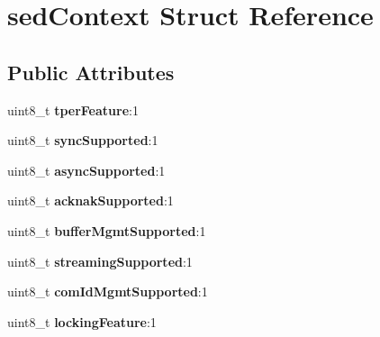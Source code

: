 \hypertarget{structsedContext}{}\section{sed\+Context Struct Reference}
\label{structsedContext}
\subsection*{Public Attributes}
\begin{DoxyCompactItemize}
\item 
\hypertarget{structsedContext_a61b26a703c8644656c659209c41af8ef}{}uint8\+\_\+t {\bfseries tper\+Feature}\+:1\label{structsedContext_a61b26a703c8644656c659209c41af8ef}

\item 
\hypertarget{structsedContext_aca5ece3d17d3036b8eac39f3b74863ba}{}uint8\+\_\+t {\bfseries sync\+Supported}\+:1\label{structsedContext_aca5ece3d17d3036b8eac39f3b74863ba}

\item 
\hypertarget{structsedContext_a5ebedb21ebad3a956ec98db8b57cd6a3}{}uint8\+\_\+t {\bfseries async\+Supported}\+:1\label{structsedContext_a5ebedb21ebad3a956ec98db8b57cd6a3}

\item 
\hypertarget{structsedContext_a573912f43dd78c764751b843e8e62836}{}uint8\+\_\+t {\bfseries acknak\+Supported}\+:1\label{structsedContext_a573912f43dd78c764751b843e8e62836}

\item 
\hypertarget{structsedContext_a5f1841b0a39832bc74b27b3b09e091c3}{}uint8\+\_\+t {\bfseries buffer\+Mgmt\+Supported}\+:1\label{structsedContext_a5f1841b0a39832bc74b27b3b09e091c3}

\item 
\hypertarget{structsedContext_a23bbfb8cfa49264710c1caa83a1aac0a}{}uint8\+\_\+t {\bfseries streaming\+Supported}\+:1\label{structsedContext_a23bbfb8cfa49264710c1caa83a1aac0a}

\item 
\hypertarget{structsedContext_acabf8f587429b1ff5c26c11fff0bb4ea}{}uint8\+\_\+t {\bfseries com\+Id\+Mgmt\+Supported}\+:1\label{structsedContext_acabf8f587429b1ff5c26c11fff0bb4ea}

\item 
\hypertarget{structsedContext_a59a5e19421db42060c55e368f25cb068}{}uint8\+\_\+t {\bfseries locking\+Feature}\+:1\label{structsedContext_a59a5e19421db42060c55e368f25cb068}


\end{DoxyCompactItemize}
